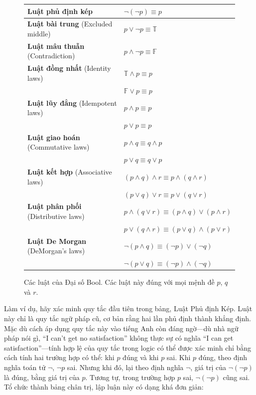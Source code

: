 \begin{figure}[h]
\centering
\begin{tabular}{l|l}
\hline
\textbf{Luật phủ định kép} & $\lnot(\lnot p) \equiv p$ \\
\hline
\textbf{Luật bài trung} (Excluded middle) & $p \lor \lnot p \equiv \mathbb{T}$ \\
\hline
\textbf{Luật mâu thuẫn} (Contradiction) & $p \land \lnot p \equiv \mathbb{F}$ \\
\hline
\textbf{Luật đồng nhất} (Identity laws) & $\mathbb{T} \land p \equiv p$ \\
 & $\mathbb{F} \lor p \equiv p$ \\
\hline
\textbf{Luật lũy đẳng} (Idempotent laws) & $p \land p \equiv p$ \\
 & $p \lor p \equiv p$ \\
\hline
\textbf{Luật giao hoán} (Commutative laws) & $p \land q \equiv q \land p$ \\
 & $p \lor q \equiv q \lor p$ \\
\hline
\textbf{Luật kết hợp} (Associative laws) & $(p \land q) \land r \equiv p \land (q \land r)$ \\
 & $(p \lor q) \lor r \equiv p \lor (q \lor r)$ \\
\hline
\textbf{Luật phân phối} (Distributive laws) & $p \land (q \lor r) \equiv (p \land q) \lor (p \land r)$ \\
 & $p \lor (q \land r) \equiv (p \lor q) \land (p \lor r)$ \\
\hline
\textbf{Luật De Morgan} (DeMorgan's laws) & $\lnot(p \land q) \equiv (\lnot p) \lor (\lnot q)$ \\
 & $\lnot(p \lor q) \equiv (\lnot p) \land (\lnot q)$ \\
\hline
\end{tabular}
\caption{Các luật của Đại số Bool. Các luật này đúng với mọi mệnh đề $p$, $q$ và $r$.}
\label{fig:boolean_laws}
\end{figure}

Làm ví dụ, hãy xác minh quy tắc đầu tiên trong bảng, Luật Phủ định Kép. Luật này chỉ là quy tắc ngữ pháp cũ, cơ bản rằng hai lần phủ định thành khẳng định. Mặc dù cách áp dụng quy tắc này vào tiếng Anh còn đáng ngờ---dù nhà ngữ pháp nói gì, ``I can't get no satisfaction'' không thực sự có nghĩa ``I can get satisfaction''---tính hợp lệ của quy tắc trong logic có thể được xác minh chỉ bằng cách tính hai trường hợp có thể: khi $p$ đúng và khi $p$ sai. Khi $p$ đúng, theo định nghĩa toán tử $\lnot$, $\lnot p$ sai. Nhưng khi đó, lại theo định nghĩa $\lnot$, giá trị của $\lnot(\lnot p)$ là đúng, bằng giá trị của $p$. Tương tự, trong trường hợp $p$ sai, $\lnot(\lnot p)$ cũng sai. Tổ chức thành bảng chân trị, lập luận này có dạng khá đơn giản:

